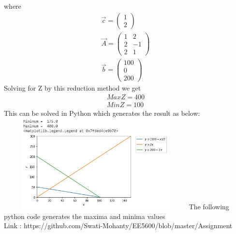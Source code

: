 \documentclass[journal,12pt,twocolumn]{IEEEtran}
\newcommand{\myvec}[1]{\ensuremath{\begin{pmatrix}#1\end{pmatrix}}}
\begin{document}
where
\begin{align}
    \Vec{c}=\myvec{1\\2}\\
    \Vec{A}=\myvec{1 & 2\\2 & -1\\2 & 1}\\
    \Vec{b}=\myvec{100\\0\\200}
\end{align}
Solving for Z by this reduction method we get
\begin{align}
    Max Z = 400 
    \\Min Z = 100
\end{align}
This can be solved in Python which generates the result as below: 
\\\includegraphics[width=10cm, height=5cm]{plot.jpg}
The following python code generates the maxima and minima values
\\Link : https://github.com/Swati-Mohanty/EE5600/blob/master/Assignment%
\end{document}
